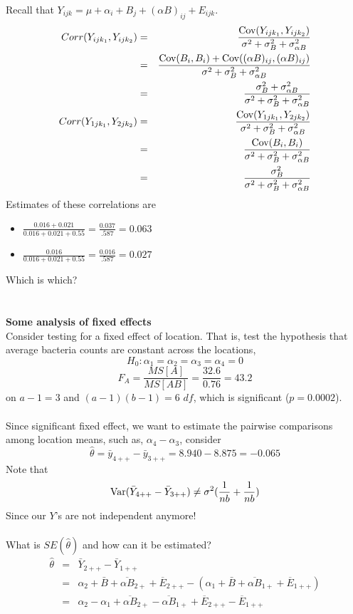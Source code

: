 Recall that $Y_{ijk}=\mu + \alpha_i + B_j + (\alpha B)_{ij} +E_{ijk}$.
\begin{eqnarray*}
Corr(Y_{ij k_1},Y_{ij k_2}) & = & \frac{\mbox{Cov}(Y_{ij k_1},Y_{ij k_2})} 
{\sigma^2 + \sigma_{B}^2 + \sigma_{\alpha B}^2}\\
& = & \frac{\mbox{Cov}(B_i,B_i) + \mbox{Cov}((\alpha B)_{ij}, (\alpha B)_{ij})}
{\sigma^2 + \sigma_{B}^2 + \sigma_{\alpha B}^2}\\
& = & \frac{\sigma_B^2 + \sigma_{\alpha B}^2}
{\sigma^2 + \sigma_{B}^2 + \sigma_{\alpha B}^2}\\
Corr(Y_{1 j k_1},Y_{2j k_2}) & = & \frac{\mbox{Cov}(Y_{1j k_1},Y_{2j k_2})} 
{\sigma^2 + \sigma_{B}^2 + \sigma_{\alpha B}^2}\\
& = & \frac{\mbox{Cov}(B_i,B_i)} 
{\sigma^2 + \sigma_{B}^2 + \sigma_{\alpha B}^2}\\
& = & \frac{\sigma_B^2} 
{\sigma^2 + \sigma_{B}^2 + \sigma_{\alpha B}^2}\\
\end{eqnarray*}
Estimates of these correlations are 
\begin{itemize}
\item $\frac{0.016+0.021}{0.016 + 0.021 + 0.55} = \frac{0.037}{.587} = 0.063$
\item $\frac{0.016}{0.016 + 0.021 + 0.55} = \frac{0.016}{.587} = 0.027$
\end{itemize}
Which is which?\\~\\~\\
\textbf{Some analysis of fixed effects}\\
Consider testing for a fixed effect of location.  That is, test the hypothesis that average bacteria counts are constant across the locations, $$H_0:  \alpha_1=\alpha_2=\alpha_3=\alpha_4=0$$
$$ F_A = \frac{MS[A]}{MS[AB]} = \frac{32.6}{0.76} = 43.2$$
on $a-1=3$ and $(a-1)(b-1)=6$ $df$, which is significant ($p=0.0002$).\\~\\
Since significant fixed effect, we want to estimate the pairwise comparisons among location means, such as, $\alpha_4-\alpha_3$, consider
$$\hat\theta=\bar{y}_{4++}-\bar{y}_{3++} = 8.940-8.875 = - 0.065$$
Note that 
$$ \mbox{Var}(\bar{Y}_{4++}-\bar{Y}_{3++}) \neq \sigma^2(\frac{1}{nb} + \frac{1}{nb})$$
Since our $Y$'s are not independent anymore!\\~\\
What is $SE(\hat\theta)$ and how can it be estimated?
\begin{eqnarray*}
\hat\theta &=& \bar{Y}_{2++}-\bar{Y}_{1++} \\
&=& \alpha_2 + \bar{B} + \overline{\alpha B}_{2+} + \overline{E}_{2++} -(\alpha_1 + \bar{B} + \overline{\alpha B}_{1+} + \overline{E}_{1++}) \\
&=& \alpha_2 -\alpha_1 + \overline{\alpha B}_{2+} - \overline{\alpha B}_{1+} + \overline{E}_{2++} - \overline{E}_{1++} 
\end{eqnarray*} 
